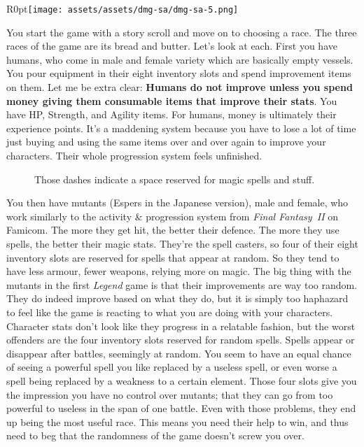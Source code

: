 \documentclass{book}
\begin{document}
\begin{wrapfigure}{R}{0pt}{\texttt{[image: assets/assets/dmg-sa/dmg-sa-5.png]}}\end{wrapfigure}
You start the game with a story scroll and move on to choosing a race. The three races of the game are its bread and butter. Let’s look at each. First you have humans, who come in male and female variety which are basically empty vessels. You pour equipment in their eight inventory slots and spend improvement items on them. Let me be extra clear: \textbf{Humans do not improve unless you spend money giving them consumable items that improve their stats}. You have HP, Strength, and Agility items. For humans, money is ultimately their experience points. It’s a maddening system because you have to lose a lot of time just buying and using the same items over and over again to improve your characters. Their whole progression system feels unfinished.\par
\FloatBarrier\vspace{\baselineskip}\begin{figure}[H]\caption*{Those dashes indicate a space reserved for magic spells and stuff.}\end{figure}
You then have mutants (Espers in the Japanese version), male and female, who work similarly to the activity \& progression system from \emph{Final Fantasy~II} on Famicom. The more they get hit, the better their defence. The more they use spells, the better their magic stats. They’re the spell casters, so four of their eight inventory slots are reserved for spells that appear at random. So they tend to have less armour, fewer weapons, relying more on magic. The big thing with the mutants in the first \emph{Legend} game is that their improvements are way too random. They do indeed improve based on what they do, but it is simply too haphazard to feel like the game is reacting to what you are doing with your characters. Character stats don’t look like they progress in a relatable fashion, but the worst offenders are the four inventory slots reserved for random spells. Spells appear or disappear after battles, seemingly at random. You seem to have an equal chance of seeing a powerful spell you like replaced by a useless spell, or even worse a spell being replaced by a weakness to a certain element. Those four slots give you the impression you have no control over mutants; that they can go from too powerful to useless in the span of one battle. Even with those problems, they end up being the most useful race. This means you need their help to win, and thus need to beg that the randomness of the game doesn’t screw you over.\par
\end{document}
